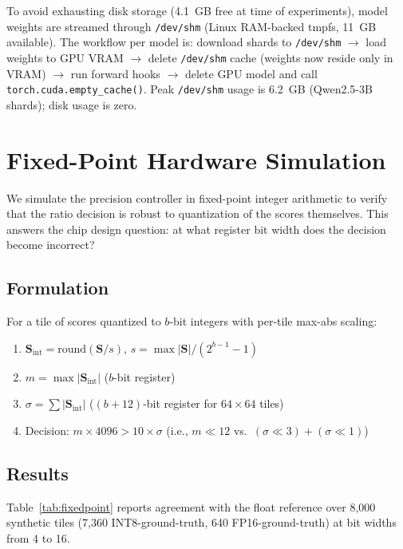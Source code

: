 \documentclass[10pt,twocolumn]{article}
\begin{document}
To avoid exhausting disk storage (4.1~GB free at time of experiments),
model weights are streamed through \texttt{/dev/shm} (Linux RAM-backed
tmpfs, 11~GB available). The workflow per model is: download shards to
\texttt{/dev/shm} $\to$ load weights to GPU VRAM $\to$ delete
\texttt{/dev/shm} cache (weights now reside only in VRAM) $\to$ run
forward hooks $\to$ delete GPU model and call
\texttt{torch.cuda.empty\_cache()}. Peak \texttt{/dev/shm} usage is
6.2~GB (Qwen2.5-3B shards); disk usage is zero.

\section{Fixed-Point Hardware Simulation}
\label{sec:fixedpoint}

We simulate the precision controller in fixed-point integer arithmetic
to verify that the ratio decision is robust to quantization of the
scores themselves. This answers the chip design question: at what
register bit width does the decision become incorrect?

\subsection{Formulation}

For a tile of scores quantized to $b$-bit integers with per-tile
max-abs scaling:
\begin{enumerate}
  \item $\mathbf{S}_\text{int} = \mathrm{round}(\mathbf{S} / s)$,\;
    $s = \max|\mathbf{S}| / (2^{b-1}-1)$
  \item $m = \max|\mathbf{S}_\text{int}|$ \quad ($b$-bit register)
  \item $\sigma = \sum|\mathbf{S}_\text{int}|$ \quad ($(b+12)$-bit register
    for $64\times64$ tiles)
  \item Decision: $m \times 4096 > 10 \times \sigma$
    (i.e., $m \ll 12$ vs.\ $(\sigma \ll 3) + (\sigma \ll 1)$)
\end{enumerate}

\subsection{Results}

Table~\ref{tab:fixedpoint} reports agreement with the float reference
over 8{,}000 synthetic tiles (7{,}360 INT8-ground-truth, 640
FP16-ground-truth) at bit widths from 4 to 16.
\end{document}
